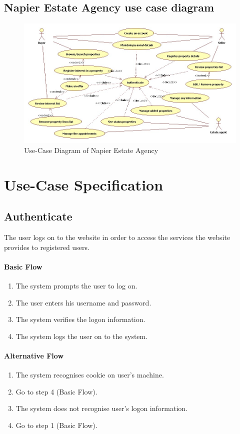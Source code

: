 \documentclass[a4paper,12pt]{article}
\begin{document}
\subsection{Napier Estate Agency use case diagram}
\begin{figure}[htbp]
\begin{center}
\includegraphics[width=\linewidth]{pics/useCases.jpg}
\end{center}
\caption{\footnotesize Use-Case Diagram of Napier Estate Agency}
\end{figure}


\section{Use-Case Specification}

\subsection{Authenticate}
The user logs on to the website in order to access the services the website provides to registered users.
\paragraph{Basic Flow}
\begin{enumerate}
\item The system prompts the user to log on.
\item The user enters his username and password.
\item The system verifies the logon information.
\item The system logs the user on to the system.
\end{enumerate}
\paragraph{Alternative Flow}
\begin{enumerate}
\item The system recognises cookie on user's machine.
\item Go to step 4 (Basic Flow).
\item The system does not recognise user's logon information.
\item Go to step 1 (Basic Flow).
\end{enumerate}
\end{document}
